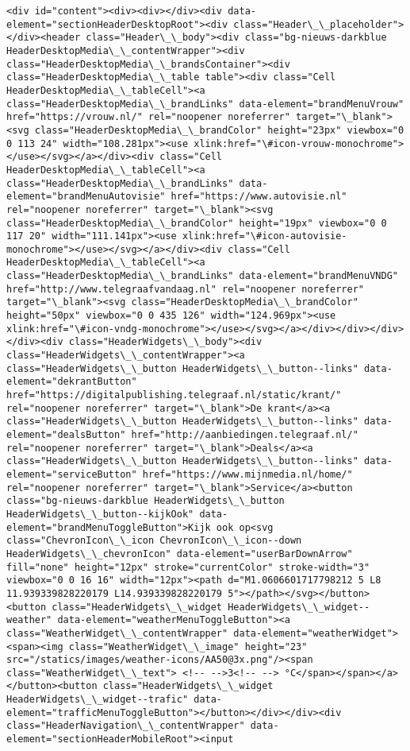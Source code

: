 \documentclass[11pt]{article}
\begin{document}
    \begin{Verbatim}[commandchars=\\\{\}]
<div id="content"><div><div></div><div data-element="sectionHeaderDesktopRoot"><div class="Header\_\_placeholder"></div><header class="Header\_\_body"><div class="bg-nieuws-darkblue HeaderDesktopMedia\_\_contentWrapper"><div class="HeaderDesktopMedia\_\_brandsContainer"><div class="HeaderDesktopMedia\_\_table table"><div class="Cell HeaderDesktopMedia\_\_tableCell"><a class="HeaderDesktopMedia\_\_brandLinks" data-element="brandMenuVrouw" href="https://vrouw.nl/" rel="noopener noreferrer" target="\_blank"><svg class="HeaderDesktopMedia\_\_brandColor" height="23px" viewbox="0 0 113 24" width="108.281px"><use xlink:href="\#icon-vrouw-monochrome"></use></svg></a></div><div class="Cell HeaderDesktopMedia\_\_tableCell"><a class="HeaderDesktopMedia\_\_brandLinks" data-element="brandMenuAutovisie" href="https://www.autovisie.nl" rel="noopener noreferrer" target="\_blank"><svg class="HeaderDesktopMedia\_\_brandColor" height="19px" viewbox="0 0 117 20" width="111.141px"><use xlink:href="\#icon-autovisie-monochrome"></use></svg></a></div><div class="Cell HeaderDesktopMedia\_\_tableCell"><a class="HeaderDesktopMedia\_\_brandLinks" data-element="brandMenuVNDG" href="http://www.telegraafvandaag.nl" rel="noopener noreferrer" target="\_blank"><svg class="HeaderDesktopMedia\_\_brandColor" height="50px" viewbox="0 0 435 126" width="124.969px"><use xlink:href="\#icon-vndg-monochrome"></use></svg></a></div></div></div></div><div class="HeaderWidgets\_\_body"><div class="HeaderWidgets\_\_contentWrapper"><a class="HeaderWidgets\_\_button HeaderWidgets\_\_button--links" data-element="dekrantButton" href="https://digitalpublishing.telegraaf.nl/static/krant/" rel="noopener noreferrer" target="\_blank">De krant</a><a class="HeaderWidgets\_\_button HeaderWidgets\_\_button--links" data-element="dealsButton" href="http://aanbiedingen.telegraaf.nl/" rel="noopener noreferrer" target="\_blank">Deals</a><a class="HeaderWidgets\_\_button HeaderWidgets\_\_button--links" data-element="serviceButton" href="https://www.mijnmedia.nl/home/" rel="noopener noreferrer" target="\_blank">Service</a><button class="bg-nieuws-darkblue HeaderWidgets\_\_button HeaderWidgets\_\_button--kijkOok" data-element="brandMenuToggleButton">Kijk ook op<svg class="ChevronIcon\_\_icon ChevronIcon\_\_icon--down HeaderWidgets\_\_chevronIcon" data-element="userBarDownArrow" fill="none" height="12px" stroke="currentColor" stroke-width="3" viewbox="0 0 16 16" width="12px"><path d="M1.0606601717798212 5 L8 11.939339828220179 L14.939339828220179 5"></path></svg></button><button class="HeaderWidgets\_\_widget HeaderWidgets\_\_widget--weather" data-element="weatherMenuToggleButton"><a class="WeatherWidget\_\_contentWrapper" data-element="weatherWidget"><span><img class="WeatherWidget\_\_image" height="23" src="/statics/images/weather-icons/AA50@3x.png"/><span class="WeatherWidget\_\_text"> <!-- -->3<!-- --> °C</span></span></a></button><button class="HeaderWidgets\_\_widget HeaderWidgets\_\_widget--trafic" data-element="trafficMenuToggleButton"></button></div></div><div class="HeaderNavigation\_\_contentWrapper" data-element="sectionHeaderMobileRoot"><input 
\end{Verbatim}
\end{document}
